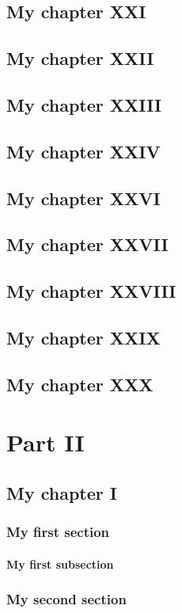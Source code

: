 \documentclass[open=any, titlepage=false, twocolumn, fontsize=10pt,]{scrbook}
\begin{document}
    \chapter{My chapter XXI}
    \chapter{My chapter XXII}
    \chapter{My chapter XXIII}
    \chapter{My chapter XXIV}
    \chapter{My chapter XXVI}
    \chapter{My chapter XXVII}
    \chapter{My chapter XXVIII}
    \chapter{My chapter XXIX}
    \chapter{My chapter XXX}
\part{Part II}
\parttoc
    \chapter{My chapter I}
        \section{My first section}  
          \blindtext
            \subsection{My first subsection}
                \blindtext  
        \section{My second section}
            \blindtext 
\end{document}
